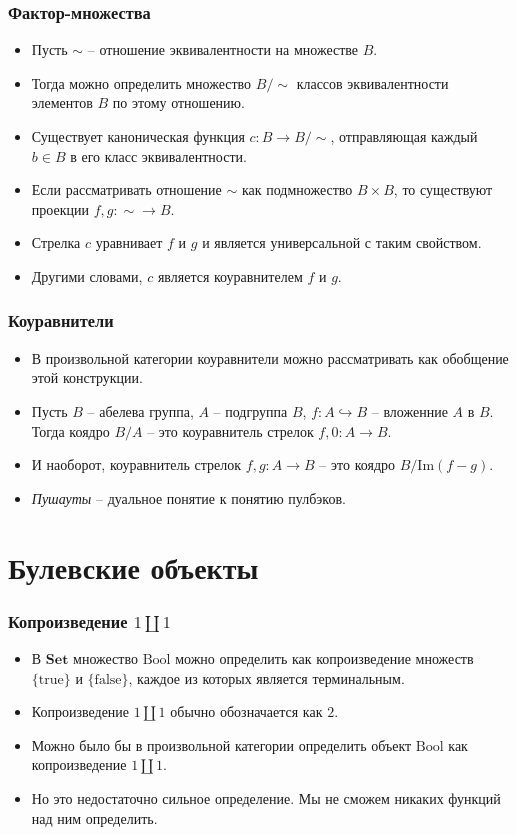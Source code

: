 \documentclass{beamer}
\theoremstyle{definition}
\newcommand{\cat}[1]{\mathbf{#1}}
\newcommand{\Set}{\cat{Set}}
\newcommand{\im}{\mathrm{Im}}
\newcommand{\bool}{\mathrm{Bool}}
\newcommand{\true}{\mathrm{true}}
\newcommand{\false}{\mathrm{false}}
\begin{document}
\begin{frame}
\frametitle{Фактор-множества}
\begin{itemize}
\item Пусть $\sim$ -- отношение эквивалентности на множестве $B$.
\item Тогда можно определить множество $B / \sim$ классов эквивалентности элементов $B$ по этому отношению.
\item Существует каноническая функция $c : B \to B / \sim$, отправляющая каждый $b \in B$ в его класс эквивалентности.
\item Если рассматривать отношение $\sim$ как подмножество $B \times B$, то существуют проекции $f, g : \sim \to B$.
\item Стрелка $c$ уравнивает $f$ и $g$ и является универсальной с таким свойством.
\item Другими словами, $c$ является коуравнителем $f$ и $g$.
\end{itemize}
\end{frame}

\begin{frame}
\frametitle{Коуравнители}
\begin{itemize}
\item В произвольной категории коуравнители можно рассматривать как обобщение этой конструкции.
\item Пусть $B$ -- абелева группа, $A$ -- подгруппа $B$, $f : A \hookrightarrow B$ -- вложенние $A$ в $B$.
Тогда коядро $B/A$ -- это коуравнитель стрелок $f,0 : A \to B$.
\item И наоборот, коуравнитель стрелок $f,g : A \to B$ -- это коядро $B/\im(f-g)$.
\item \emph{Пушауты} -- дуальное понятие к понятию пулбэков.
\end{itemize}
\end{frame}

\section{Булевские объекты}

\begin{frame}
\frametitle{Копроизведение $1 \amalg 1$}
\begin{itemize}
\item В $\Set$ множество $\bool$ можно определить как копроизведение множеств $\{ \true \}$ и $\{ \false \}$, каждое из которых является терминальным.
\item Копроизведение $1 \amalg 1$ обычно обозначается как $2$.
\item Можно было бы в произвольной категории определить объект $\bool$ как копроизведение $1 \amalg 1$.
\item Но это недостаточно сильное определение. Мы не сможем никаких функций над ним определить.
\end{itemize}
\end{frame}
\end{document}
